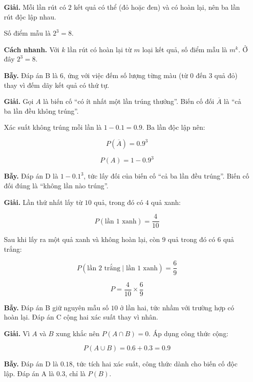 \documentclass[11pt, a4paper]{article}
\begin{document}
\begin{dapan}[7 — Đáp án D]
\textbf{Giải.} Mỗi lần rút có $2$ kết quả có thể (đỏ hoặc đen) và có hoàn lại, nên ba lần rút độc lập nhau.

Số điểm mẫu là $2^3 = 8$.

\textbf{Cách nhanh.} Với $k$ lần rút có hoàn lại từ $m$ loại kết quả, số điểm mẫu là $m^k$. Ở đây $2^3 = 8$.

\textbf{Bẫy.} Đáp án B là $6$, ứng với việc đếm số lượng từng màu (từ $0$ đến $3$ quả đỏ) thay vì đếm dãy kết quả có thứ tự.
\end{dapan}

\begin{dapan}[8 — Đáp án B]
\textbf{Giải.} Gọi $A$ là biến cố “có ít nhất một lần trúng thưởng”. Biến cố đối $\overline{A}$ là “cả ba lần đều không trúng”.

Xác suất không trúng mỗi lần là $1 - 0.1 = 0.9$. Ba lần độc lập nên:

$$P(\overline{A}) = 0.9^3$$

$$P(A) = 1 - 0.9^3$$

\textbf{Bẫy.} Đáp án D là $1 - 0.1^3$, tức lấy đối của biến cố “cả ba lần đều trúng”. Biến cố đối đúng là “không lần nào trúng”.
\end{dapan}

\begin{dapan}[9 — Đáp án A]
\textbf{Giải.} Lần thứ nhất lấy từ $10$ quả, trong đó có $4$ quả xanh:

$$P(\text{lần 1 xanh}) = \frac{4}{10}$$

Sau khi lấy ra một quả xanh và không hoàn lại, còn $9$ quả trong đó có $6$ quả trắng:

$$P(\text{lần 2 trắng} \mid \text{lần 1 xanh}) = \frac{6}{9}$$

$$P = \frac{4}{10} \times \frac{6}{9}$$

\textbf{Bẫy.} Đáp án B giữ nguyên mẫu số $10$ ở lần hai, tức nhầm với trường hợp có hoàn lại. Đáp án C cộng hai xác suất thay vì nhân.
\end{dapan}

\begin{dapan}[10 — Đáp án B]
\textbf{Giải.} Vì $A$ và $B$ xung khắc nên $P(A \cap B) = 0$. Áp dụng công thức cộng:

$$P(A \cup B) = 0.6 + 0.3 = 0.9$$

\textbf{Bẫy.} Đáp án D là $0.18$, tức tích hai xác suất, công thức dành cho biến cố độc lập. Đáp án A là $0.3$, chỉ là $P(B)$.
\end{dapan}
\end{document}
